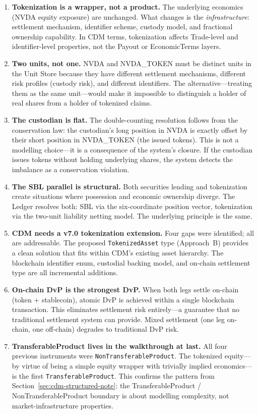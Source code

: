 \documentclass[11pt,a4paper]{article}
\begin{document}
\begin{enumerate}
\item \textbf{Tokenization is a wrapper, not a product.} The underlying economics (NVDA equity exposure) are unchanged. What changes is the \emph{infrastructure}: settlement mechanism, identifier scheme, custody model, and fractional ownership capability. In CDM terms, tokenization affects Trade-level and identifier-level properties, not the Payout or EconomicTerms layers.

\item \textbf{Two units, not one.} NVDA and NVDA\_TOKEN must be distinct units in the Unit Store because they have different settlement mechanisms, different risk profiles (custody risk), and different identifiers. The alternative---treating them as the same unit---would make it impossible to distinguish a holder of real shares from a holder of tokenized claims.

\item \textbf{The custodian is flat.} The double-counting resolution follows from the conservation law: the custodian's long position in NVDA is exactly offset by their short position in NVDA\_TOKEN (the issued tokens). This is not a modelling choice---it is a consequence of the system's closure. If the custodian issues tokens without holding underlying shares, the system detects the imbalance as a conservation violation.

\item \textbf{The SBL parallel is structural.} Both securities lending and tokenization create situations where possession and economic ownership diverge. The Ledger resolves both: SBL via the six-coordinate position vector, tokenization via the two-unit liability netting model. The underlying principle is the same.

\item \textbf{CDM needs a v7.0 tokenization extension.} Four gaps were identified; all are addressable. The proposed \texttt{TokenizedAsset} type (Approach~B) provides a clean solution that fits within CDM's existing asset hierarchy. The blockchain identifier enum, custodial backing model, and on-chain settlement type are all incremental additions.

\item \textbf{On-chain DvP is the strongest DvP.} When both legs settle on-chain (token + stablecoin), atomic DvP is achieved within a single blockchain transaction. This eliminates settlement risk entirely---a guarantee that no traditional settlement system can provide. Mixed settlement (one leg on-chain, one off-chain) degrades to traditional DvP risk.

\item \textbf{TransferableProduct lives in the walkthrough at last.} All four previous instruments were \texttt{NonTransferableProduct}. The tokenized equity---by virtue of being a simple equity wrapper with trivially implied economics---is the first \texttt{TransferableProduct}. This confirms the pattern from Section~\ref{sec:cdm-structured-note}: the TransferableProduct / NonTransferableProduct boundary is about modelling complexity, not market-infrastructure properties.
\end{enumerate}
\end{document}
